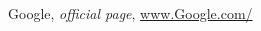\begin{thebibliography}{99999}
\singlespace\normalsize

 Google, \textit{ official page}, \url{www.Google.com/}





\end{thebibliography}
